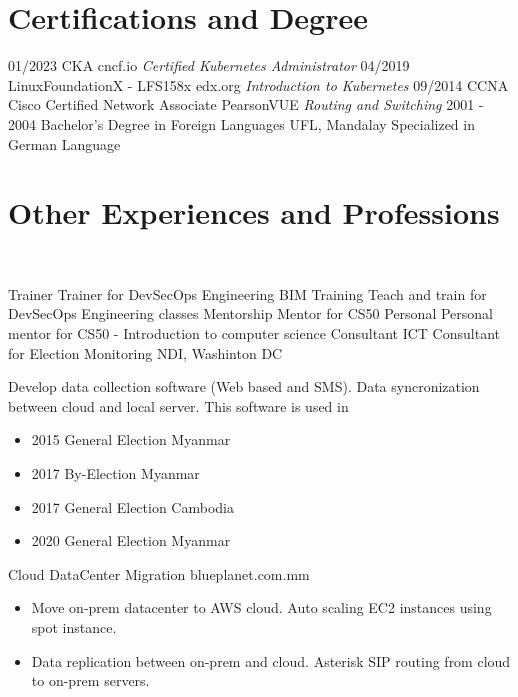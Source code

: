 \documentclass[]{friggeri-cv}
\begin{document}
\section{Certifications and Degree}
\begin{entrylist}
  \entry
  {01/2023}
  {CKA}
  {cncf.io}
  {\emph{Certified Kubernetes Administrator}}
  \entry
  {04/2019}
  {LinuxFoundationX - LFS158x}
  {edx.org}
  {\emph{Introduction to Kubernetes}}
  \entry
  {09/2014}
  {CCNA Cisco Certified Network Associate}
  {PearsonVUE}
  {\emph{Routing and Switching}}
  \entry
  {2001 - 2004}
  {Bachelor's Degree in Foreign Languages}
  {UFL, Mandalay}
  {Specialized in German Language\\ }
  
\end{entrylist}
\newpage
\section{Other Experiences and Professions}
~
\begin{entrylist}
  \entry
  {Trainer}
  {Trainer for DevSecOps Engineering}
  {BIM Training}
  {Teach and train for DevSecOps Engineering classes}
  \entry
  {Mentorship}
  {Mentor for CS50}
  {Personal}
  {Personal mentor for CS50 - Introduction to computer science}
  \entry
  {Consultant}
  {ICT Consultant for Election Monitoring}
  {NDI, Washinton DC}
  {Develop data collection software (Web based and SMS). Data syncronization between cloud and local server. This software is used in 
    \begin{itemize}
      \item 2015 General Election Myanmar
      \item 2017 By-Election Myanmar
      \item 2017 General Election Cambodia
      \item 2020 General Election Myanmar
    \end{itemize}}
  \entry
  {Cloud}
  {DataCenter Migration}
  {blueplanet.com.mm}
  {
    \begin{itemize}
      \item Move on-prem datacenter to AWS cloud. Auto scaling EC2 instances using spot instance. 
      \item Data replication between on-prem and cloud. Asterisk SIP routing from cloud to on-prem servers.
    \end{itemize}}
\end{entrylist}
\end{document}
